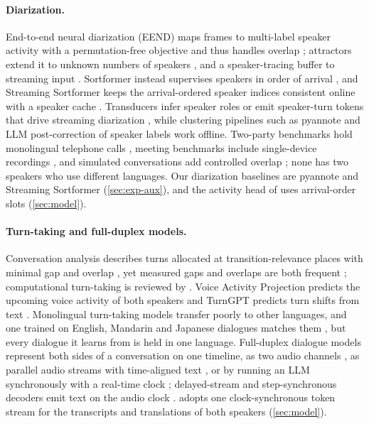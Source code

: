 \paragraph{Diarization.}
End-to-end neural diarization (EEND) maps frames to multi-label speaker activity with a permutation-free objective and thus handles overlap \citep{fujita2019end,fujita2019endselfattention}; attractors extend it to unknown numbers of speakers \citep{horiguchi2020end}, and a speaker-tracing buffer to streaming input \citep{xue2021online}. Sortformer instead supervises speakers in order of arrival \citep{park2025sortformer}, and Streaming Sortformer keeps the arrival-ordered speaker indices consistent online with a speaker cache \citep{medennikov2025streaming}. Transducers infer speaker roles \citep{elshafey2019joint} or emit speaker-turn tokens that drive streaming diarization \citep{xia2022turn}, while clustering pipelines such as pyannote \citep{bredin2023pyannote} and LLM post-correction of speaker labels \citep{wang2024diarizationlm} work offline. Two-party benchmarks hold monolingual telephone calls \citep{godfrey1992switchboard,cieri2004fisher,canavan1997callhome}, meeting benchmarks include single-device recordings \citep{carletta2006ami,vinnikov2024notsofar}, and simulated conversations add controlled overlap \citep{chen2020continuous,cosentino2020librimix,landini2022from}; none has two speakers who use different languages. Our diarization baselines are pyannote and Streaming Sortformer (\cref{sec:exp-aux}), and the activity head of \model uses arrival-order slots (\cref{sec:model}).

\paragraph{Turn-taking and full-duplex models.}
Conversation analysis describes turns allocated at transition-relevance places with minimal gap and overlap \citep{sacks1974simplest}, yet measured gaps and overlaps are both frequent \citep{heldner2010pauses}; computational turn-taking is reviewed by \citet{skantze2021turntaking}. Voice Activity Projection predicts the upcoming voice activity of both speakers \citep{ekstedt2022voice} and TurnGPT predicts turn shifts from text \citep{ekstedt2020turngpt}. Monolingual turn-taking models transfer poorly to other languages, and one trained on English, Mandarin and Japanese dialogues matches them \citep{inoue2024multilingual}, but every dialogue it learns from is held in one language. Full-duplex dialogue models represent both sides of a conversation on one timeline, as two audio channels \citep{nguyen2023generative}, as parallel audio streams with time-aligned text \citep{defossez2024moshi}, or by running an LLM synchronously with a real-time clock \citep{veluri2024beyond}; delayed-stream and step-synchronous decoders emit text on the audio clock \citep{zeghidour2025streaming,seide2024speech}. \model adopts one clock-synchronous token stream for the transcripts and translations of both speakers (\cref{sec:model}).


